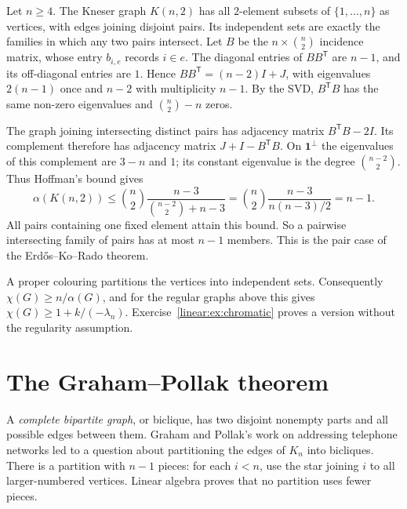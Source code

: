 \begin{example}\label{linear:exa:ekr}
Let $n\ge4$. The Kneser graph $K(n,2)$ has all $2$-element subsets of $\{1,\ldots,n\}$ as vertices, with edges joining disjoint pairs. Its independent sets are exactly the families in which any two pairs intersect.
Let $B$ be the $n\times\binom n2$ incidence matrix, whose entry $b_{i,e}$ records $i\in e$. The diagonal entries of $BB^{\mathsf T}$ are $n-1$, and its off-diagonal entries are $1$. Hence
$BB^{\mathsf T}=(n-2)I+J$, with eigenvalues $2(n-1)$ once and $n-2$ with multiplicity $n-1$. By the SVD, $B^{\mathsf T}B$ has the same non-zero eigenvalues and $\binom n2-n$ zeros.

The graph joining intersecting distinct pairs has adjacency matrix $B^{\mathsf T}B-2I$. Its complement therefore has adjacency matrix $J+I-B^{\mathsf T}B$. On $\mathbf1^\perp$ the eigenvalues of this complement are $3-n$ and $1$; its constant eigenvalue is the degree $\binom{n-2}2$. Thus Hoffman's bound gives
\[
\alpha(K(n,2))\le\binom n2
\frac{n-3}{\binom{n-2}2+n-3}
=\binom n2\frac{n-3}{n(n-3)/2}=n-1.
\]
All pairs containing one fixed element attain this bound. So a pairwise intersecting family of pairs has at most $n-1$ members. This is the pair case of the Erd\H{o}s--Ko--Rado theorem.
\end{example}

A proper colouring partitions the vertices into independent sets. Consequently $\chi(G)\ge n/\alpha(G)$, and for the regular graphs above this gives $\chi(G)\ge1+k/(-\lambda_n)$. Exercise~\ref{linear:ex:chromatic} proves a version without the regularity assumption.

\section{The Graham--Pollak theorem}

A \emph{complete bipartite graph}, or biclique, has two disjoint nonempty parts and all possible edges between them. Graham and Pollak's work on addressing telephone networks led to a question about partitioning the edges of $K_n$ into bicliques. There is a partition with $n-1$ pieces: for each $i<n$, use the star joining $i$ to all larger-numbered vertices. Linear algebra proves that no partition uses fewer pieces.

